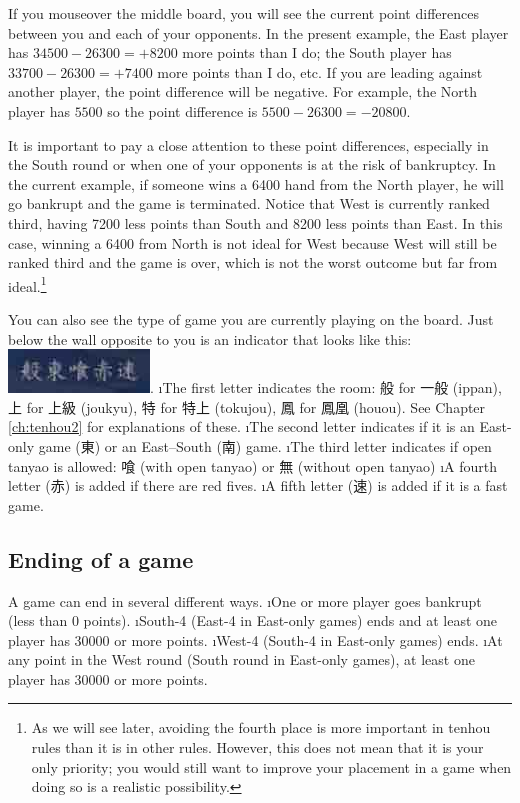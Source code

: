 \bigskip
If you mouseover the middle board, you will see the current point differences between you and each of your opponents. 
In the present example, the East player has $34500 - 26300 = + 8200$ more points than I do; the South player has $33700 - 26300 = + 7400$ more points than I do, etc. If you are leading against another player, the point difference will be negative. For example, the North player has $5500$ so the point difference is $5500 - 26300 = -20800$. 

\bigskip
It is important to pay a close attention to these point differences, especially in the South round or when one of your opponents is at the risk of bankruptcy. In the current example, if someone wins a 6400 hand from the North player, he will go bankrupt and the game is terminated. Notice that West is currently ranked third, having 7200 less points than South and 8200 less points than East. In this case, winning a 6400 from North is not ideal for West because West will still be ranked third and the game is over, which is not the worst outcome but far from ideal.\footnote{As we will see later, avoiding the fourth place is more important in {\jap tenhou} rules than it is in other rules. However, this does not mean that it is your only priority; you would still want to improve your placement in a game when doing so is a realistic possibility.}

\bigskip

You can also see the type of game you are currently playing on the board. Just below the wall opposite to you is an indicator that looks like this: \includegraphics[width=.2\textwidth,clip]{figs/gametype.jpg}. 
\bi
\i The first letter indicates the room: 般 for 一般 ({\jap ippan}), 上 for 上級 ({\jap joukyu}), 特 for 特上 ({\jap tokujou}), 鳳 for 鳳凰 ({\jap houou}). See Chapter \ref{ch:tenhou2} for explanations of these.
\i The second letter indicates if it is an East-only game (東) or an East--South (南) game.
\i The third letter indicates if open {\jap tanyao} is allowed: 喰 (with open {\jap tanyao}) or 無 (without open {\jap tanyao})
\i A fourth letter (赤) is added if there are red fives.
\i A fifth letter (速) is added if it is a fast game. 
\ei


\subsection{Ending of a game}
A game can end in several different ways. 
\bi
\i One or more player goes bankrupt (less than 0 points). 
\i South-4 (East-4 in East-only games) ends and at least one player has 30000 or more points.
\i West-4 (South-4 in East-only games) ends.
\i At any point in the West round (South round in East-only games), at least one player has 30000 or more points. 
\ei

